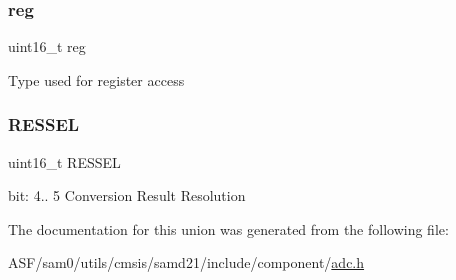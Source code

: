 \subsubsection{\texorpdfstring{reg}{reg}}
{\footnotesize\ttfamily uint16\+\_\+t reg}

Type used for register access \mbox{\label{union_a_d_c___c_t_r_l_b___type_a7738480a2a6d6c68659c330c986a193b}} 
\subsubsection{\texorpdfstring{RESSEL}{RESSEL}}
{\footnotesize\ttfamily uint16\+\_\+t R\+E\+S\+S\+EL}

bit\+: 4.. 5 Conversion Result Resolution 

The documentation for this union was generated from the following file\+:\begin{DoxyCompactItemize}
\item 
A\+S\+F/sam0/utils/cmsis/samd21/include/component/\mbox{\hyperlink{component_2adc_8h}{adc.\+h}}\end{DoxyCompactItemize}
